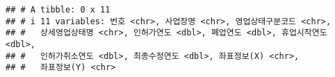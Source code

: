 \documentclass[
]{book}
\newenvironment{Shaded}{\begin{snugshade}}{\end{snugshade}}
\newcommand{\CommentTok}[1]{\textcolor[rgb]{0.56,0.35,0.01}{\textit{#1}}}
\newcommand{\FunctionTok}[1]{\textcolor[rgb]{0.00,0.00,0.00}{#1}}
\newcommand{\NormalTok}[1]{#1}
\newcommand{\OtherTok}[1]{\textcolor[rgb]{0.56,0.35,0.01}{#1}}
\newcommand{\SpecialCharTok}[1]{\textcolor[rgb]{0.00,0.00,0.00}{#1}}
\newcommand{\StringTok}[1]{\textcolor[rgb]{0.31,0.60,0.02}{#1}}
\begin{document}
\begin{Shaded}
\end{Shaded}

\begin{verbatim}
## # A tibble: 0 x 11
## # i 11 variables: 번호 <chr>, 사업장명 <chr>, 영업상태구분코드 <chr>,
## #   상세영업상태명 <chr>, 인허가연도 <dbl>, 폐업연도 <dbl>, 휴업시작연도 <dbl>,
## #   인허가취소연도 <dbl>, 최종수정연도 <dbl>, 좌표정보(X) <chr>,
## #   좌표정보(Y) <chr>
\end{verbatim}
\end{document}
